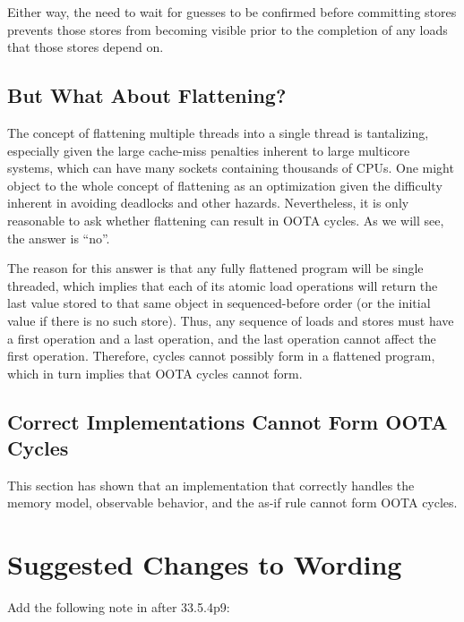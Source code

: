 \documentclass[10]{article}
\begin{document}
Either way, the need to wait for guesses to be confirmed before committing
stores prevents those stores from becoming visible prior to the
completion of any loads that those stores depend on.

\subsection{But What About Flattening?}
\label{sec:But What About Flattening?}

The concept of flattening multiple threads into a single thread is
tantalizing, especially given the large cache-miss penalties inherent
to large multicore systems, which can have many sockets containing
thousands of CPUs.
One might object to the whole concept of flattening as an
optimization given the difficulty inherent in avoiding deadlocks
and other hazards.
Nevertheless, it is only reasonable to ask whether flattening can
result in OOTA cycles.
As we will see, the answer is ``no''.

The reason for this answer is that any fully flattened program will be
single threaded, which implies that each of its atomic load operations
will return the last value stored to that same object in sequenced-before
order (or the initial value if there is no such store).
Thus, any sequence of loads and stores must have a first operation and
a last operation, and the last operation cannot affect the first
operation.
Therefore, cycles cannot possibly form in a flattened program,
which in turn implies that OOTA cycles cannot form.

\subsection{Correct Implementations Cannot Form OOTA Cycles}
\label{sec:Correct Implementations Cannot Form OOTA Cycles}

This section has shown that an implementation that correctly
handles the memory model, observable behavior, and the as-if rule
cannot form OOTA cycles.

\section{Suggested Changes to Wording}
\label{sec:Suggested Changes to Wording}

Add the following note in  after 33.5.4p9:
\end{document}
